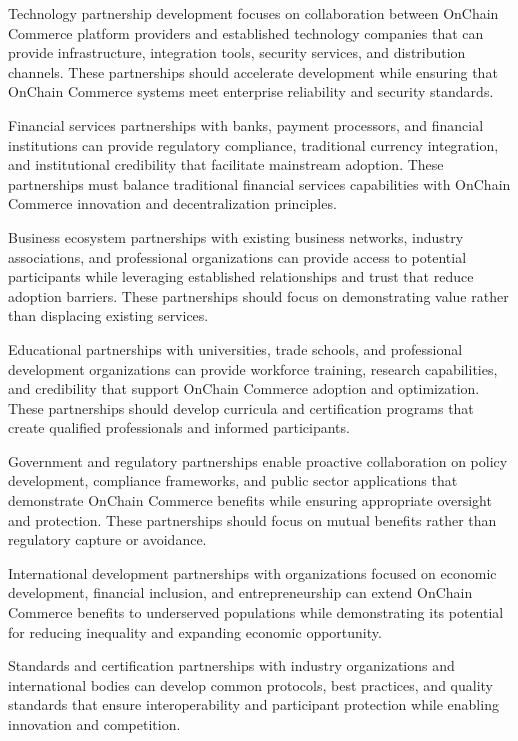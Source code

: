 \documentclass[
  Letterpaper,
]{scrbook}
\begin{document}
Technology partnership development focuses on collaboration between
OnChain Commerce platform providers and established technology companies
that can provide infrastructure, integration tools, security services,
and distribution channels. These partnerships should accelerate
development while ensuring that OnChain Commerce systems meet enterprise
reliability and security standards.

Financial services partnerships with banks, payment processors, and
financial institutions can provide regulatory compliance, traditional
currency integration, and institutional credibility that facilitate
mainstream adoption. These partnerships must balance traditional
financial services capabilities with OnChain Commerce innovation and
decentralization principles.

Business ecosystem partnerships with existing business networks,
industry associations, and professional organizations can provide access
to potential participants while leveraging established relationships and
trust that reduce adoption barriers. These partnerships should focus on
demonstrating value rather than displacing existing services.

Educational partnerships with universities, trade schools, and
professional development organizations can provide workforce training,
research capabilities, and credibility that support OnChain Commerce
adoption and optimization. These partnerships should develop curricula
and certification programs that create qualified professionals and
informed participants.

Government and regulatory partnerships enable proactive collaboration on
policy development, compliance frameworks, and public sector
applications that demonstrate OnChain Commerce benefits while ensuring
appropriate oversight and protection. These partnerships should focus on
mutual benefits rather than regulatory capture or avoidance.

International development partnerships with organizations focused on
economic development, financial inclusion, and entrepreneurship can
extend OnChain Commerce benefits to underserved populations while
demonstrating its potential for reducing inequality and expanding
economic opportunity.

Standards and certification partnerships with industry organizations and
international bodies can develop common protocols, best practices, and
quality standards that ensure interoperability and participant
protection while enabling innovation and competition.
\end{document}
